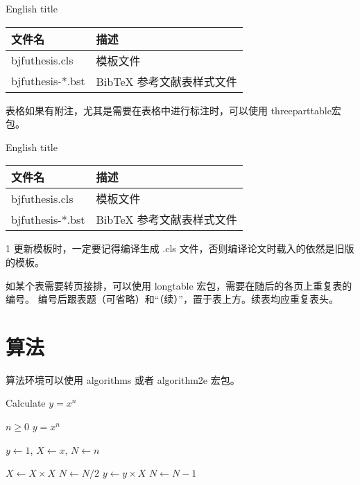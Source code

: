 \begin{table}[h]
\xiaowu

  \centering
   {English title}
  \begin{tabular}{ll}
    \toprule
    文件名          & 描述                         \\
    \midrule
    bjfuthesis.cls   & 模板文件                    \\
    bjfuthesis-*.bst & BibTeX 参考文献表样式文件    \\
    \bottomrule
  \end{tabular}
  \label{tab:three-line}
\end{table}

表格如果有附注，尤其是需要在表格中进行标注时，可以使用 threeparttable宏包。

\begin{table}[h]
\xiaowu
  \centering
  \begin{threeparttable}[c]
     {English title}
    \label{tab:three-part-table}
    \begin{tabular}{ll}
      \toprule
      文件名                 & 描述                         \\
      \midrule
      bjfuthesis.cls\tnote{1} & 模板文件                     \\
      bjfuthesis-*.bst        & BibTeX 参考文献表样式文件    \\
      \bottomrule
    \end{tabular}
    \begin{tablenotes}

      \item [1] 更新模板时，一定要记得编译生成 .cls 文件，否则编译论文时载入的依然是旧版的模板。
    \end{tablenotes}
  \end{threeparttable}
\end{table}

如某个表需要转页接排，可以使用 longtable 宏包，需要在随后的各页上重复表的编号。
编号后跟表题（可省略）和“（续）”，置于表上方。续表均应重复表头。


\section{算法}

算法环境可以使用 algorithms 或者 algorithm2e 宏包。
\renewcommand{\algorithmicrequire}{\textbf{输入：}\unskip}
\renewcommand{\algorithmicensure}{\textbf{输出：}\unskip}

\begin{algorithm}[ht]
  \caption{Calculate $y = x^n$} 
  \label{alg1}
  \small
  \begin{algorithmic}
    \REQUIRE $n \geq 0$
    \ENSURE $y = x^n$

    \STATE $y \leftarrow 1$, $X \leftarrow x$, $N \leftarrow n$

        \STATE $X \leftarrow X \times X$
        \STATE $N \leftarrow N / 2$
      \ELSE[$N$ is odd]
        \STATE $y \leftarrow y \times X$
        \STATE $N \leftarrow N - 1$
      \ENDIF
    \ENDWHILE
  \end{algorithmic}
\end{algorithm}
